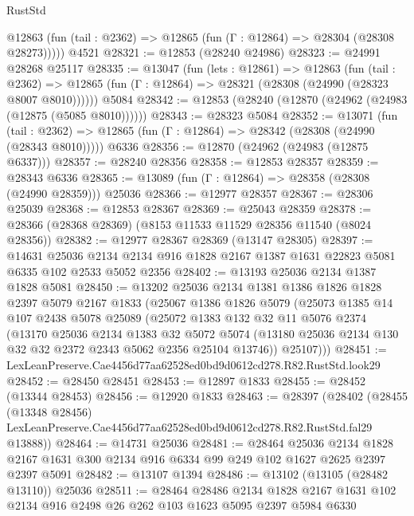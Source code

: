 \begin{lexlean}{RustStd}
\begin{coremodule}
      @12863 (fun (tail : @2362) => @12865 (fun (Γ : @12864) => @28304 (@28308 @28273)))))
    @4521
@28321 := @12853 (@28240 @24986)
@28323 := @24991 @28268 @25117
@28335 := @13047
    (fun (lets : @12861) =>
    @12863
      (fun (tail : @2362) =>
      @12865 (fun (Γ : @12864) => @28321 (@28308 (@24990 (@28323 @8007 @8010))))))
    @5084
@28342 := @12853 (@28240 (@12870 (@24962 (@24983 (@12875 (@5085 @8010))))))
@28343 := @28323 @5084
@28352 := @13071
    (fun (tail : @2362) => @12865 (fun (Γ : @12864) => @28342 (@28308 (@24990 (@28343 @8010)))))
    @6336
@28356 := @12870 (@24962 (@24983 (@12875 @6337)))
@28357 := @28240 @28356
@28358 := @12853 @28357
@28359 := @28343 @6336
@28365 := @13089 (fun (Γ : @12864) => @28358 (@28308 (@24990 @28359))) @25036
@28366 := @12977 @28357
@28367 := @28306 @25039
@28368 := @12853 @28367
@28369 := @25043 @28359
@28378 := @28366 (@28368 @28369) (@8153 @11533 @11529 @28356 @11540 (@8024 @28356))
@28382 := @12977 @28367 @28369 (@13147 @28305)
@28397 := @14631
    @25036
    @2134
    @2134
    @916
    @1828
    @2167
    @1387
    @1631
    @22823
    @5081
    @6335
    @102
    @2533
    @5052
    @2356
@28402 := @13193 @25036 @2134 @1387 @1828 @5081
@28450 := @13202
    @25036
    @2134
    @1381
    @1386
    @1826
    @1828
    @2397
    @5079
    @2167
    @1833
    (@25067
      @1386
      @1826
      @5079
      (@25073
        @1385
        @14
        @107
        @2438
        @5078
        @25089
        (@25072
          @1383
          @132
          @32
          @11
          @5076
          @2374
          (@13170
            @25036
            @2134
            @1383
            @32
            @5072
            @5074
            (@13180 @25036 @2134 @130 @32 @32 @2372 @2343 @5062 @2356 @25104 @13746))
          @25107)))
@28451 := LexLeanPreserve.Cae4456d77aa62528ed0bd9d0612cd278.R82.RustStd.look29
@28452 := @28450 @28451
@28453 := @12897 @1833
@28455 := @28452 (@13344 @28453)
@28456 := @12920 @1833
@28463 := @28397
    (@28402
      (@28455
        (@13348 @28456)
        LexLeanPreserve.Cae4456d77aa62528ed0bd9d0612cd278.R82.RustStd.fal29
        @13888))
@28464 := @14731 @25036
@28481 := @28464
    @25036
    @2134
    @1828
    @2167
    @1631
    @300
    @2134
    @916
    @6334
    @99
    @249
    @102
    @1627
    @2625
    @2397
    @2397
    @5091
@28482 := @13107 @1394
@28486 := @13102 (@13105 (@28482 @13110)) @25036
@28511 := @28464
    @28486
    @2134
    @1828
    @2167
    @1631
    @102
    @2134
    @916
    @2498
    @26
    @262
    @103
    @1623
    @5095
    @2397
    @5984
    @6330

\end{coremodule}
\end{lexlean}
